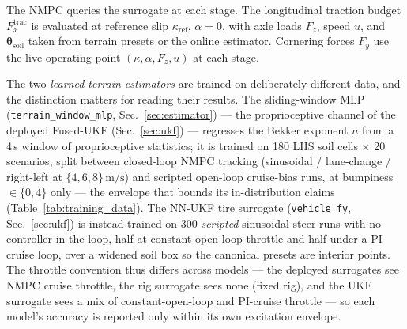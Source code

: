 \documentclass[conference,letterpaper,10pt]{IEEEtran}
\begin{document}
The NMPC queries the surrogate at each stage. The longitudinal
traction budget $F_x^{\mathrm{trac}}$ is evaluated at reference slip
$\kappa_{\mathrm{ref}}$, $\alpha = 0$, with axle loads $F_z$, speed
$u$, and $\boldsymbol{\theta}_{\mathrm{soil}}$ taken from terrain
presets or the online estimator. Cornering forces $F_y$ use the live
operating point $(\kappa, \alpha, F_z, u)$ at each stage.

The two \emph{learned terrain estimators} are trained on deliberately
different data, and the distinction matters for reading their results.
The sliding-window MLP (\texttt{terrain\_window\_mlp},
Sec.~\ref{sec:estimator}) --- the proprioceptive channel of the deployed
Fused-UKF (Sec.~\ref{sec:ukf}) --- regresses the Bekker exponent $n$ from a
4\,s window of proprioceptive statistics; it is trained on 180 LHS soil
cells $\times$ 20 scenarios, split between closed-loop NMPC tracking
(sinusoidal / lane-change / right-left at $\{4,6,8\}\,\mathrm{m/s}$) and
scripted open-loop cruise-bias runs, at bumpiness $\in\{0,4\}$ only ---
the envelope that bounds its in-distribution claims
(Table~\ref{tab:training_data}). The NN-UKF tire surrogate
(\texttt{vehicle\_fy}, Sec.~\ref{sec:ukf}) is instead trained on 300
\emph{scripted} sinusoidal-steer runs with no controller in the loop,
half at constant open-loop throttle and half under a PI cruise loop,
over a widened soil box so the canonical presets are interior points.
The throttle convention thus differs across models --- the deployed
surrogates see NMPC cruise throttle, the rig surrogate sees none
(fixed rig), and the UKF surrogate sees a mix of constant-open-loop and
PI-cruise throttle --- so each model's accuracy is reported only within
its own excitation envelope.
\end{document}
